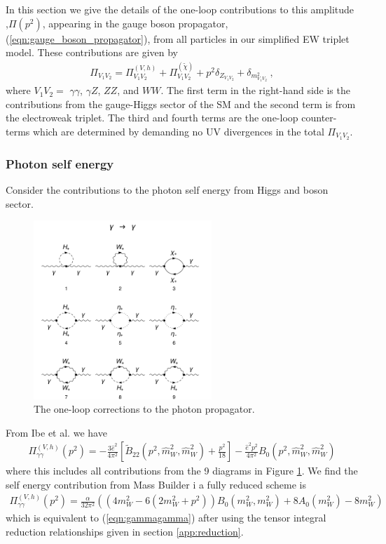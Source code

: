 \documentclass[11pt]{article}
\newcommand{\mb}{\textsf{Mass Builder} \! }
\begin{document}
In this section we give the details of the one-loop contributions to this amplitude
,$\Pi(p^2)$, appearing in the gauge boson propagator, (\ref{eqn:gauge_boson_propagator}), from all particles in our simplified EW triplet model.  These contributions are given by
{\small
\begin{eqnarray}
\Pi_{V_1 V_2}
= \Pi_{V_1 V_2}^{(V, h)}
+ \Pi_{V_1 V_2}^{(\tilde{\chi})}
+ p^2 \delta_{Z_{V_1 V_2}}
+ \delta_{m^2_{V_1 V_2}}\ ,
\end{eqnarray}
}where $V_1 V_2 =$ $\gamma \gamma$, $\gamma Z$, $ZZ$, and $WW$. The first term in the right-hand side is the contributions from the gauge-Higgs sector of the SM and the second term is from the electroweak triplet.  The third and fourth terms are the one-loop counter-terms which are determined by demanding no UV divergences in the total $\Pi_{V_1 V_2}$.



\subsubsection{Photon self energy}

Consider the contributions to the photon self energy from Higgs and boson sector. 

\begin{figure}[b!]
\center
\includegraphics[width=0.6\textwidth]{diagrams_V[1]_1.pdf}
\caption{The one-loop corrections to the photon propagator.}\label{fig:gammagamma}
\end{figure}

From Ibe et al. we have
\begin{align}
\Pi_{\gamma \gamma}^{(V, h)}(p^2) =
-\frac{3 \hat{e}^2}{4\pi^2}
\left[ \tilde{B}_{22}(p^2, \hat{m}_W^2, \hat{m}_W^2) + \frac{p^2}{18} \right]
-\frac{\hat{e}^2 p^2}{4\pi^2} B_0(p^2, \hat{m}_W^2, \hat{m}_W^2) \label{eqn:gammagamma}
\end{align}
where this includes all contributions from the 9 diagrams in Figure \ref{fig:gammagamma}.  We find the self energy contribution from \mb i a fully reduced scheme is
\begin{align}
\Pi_{\gamma \gamma}^{(V, h)}(p^2) = \frac{\alpha}{32\pi^2} \left( \left(4m_W^2-6(2m_W^2+p^2)\right)B_0(m_W^2,m_W^2)+8 A_0(m_W^2)-8m_W^2\right)
\end{align}
which is equivalent to (\ref{eqn:gammagamma}) after using the tensor integral reduction relationships given in section \ref{app:reduction}.
\end{document}
